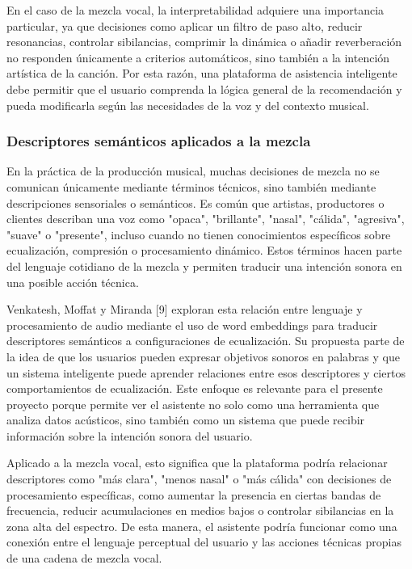 \documentclass[12pt]{article}
\begin{document}
En el caso de la mezcla vocal, la interpretabilidad adquiere una importancia particular, ya que decisiones como aplicar un filtro de paso alto, reducir resonancias, controlar sibilancias, comprimir la dinámica o añadir reverberación no responden únicamente a criterios automáticos, sino también a la intención artística de la canción. Por esta razón, una plataforma de asistencia inteligente debe permitir que el usuario comprenda la lógica general de la recomendación y pueda modificarla según las necesidades de la voz y del contexto musical.

\subsubsection*{Descriptores semánticos aplicados a la mezcla}

En la práctica de la producción musical, muchas decisiones de mezcla no se comunican únicamente mediante términos técnicos, sino también mediante descripciones sensoriales o semánticos. Es común que artistas, productores o clientes describan una voz como "opaca", "brillante", "nasal", "cálida", "agresiva", "suave" o "presente", incluso cuando no tienen conocimientos específicos sobre ecualización, compresión o procesamiento dinámico. Estos términos hacen parte del lenguaje cotidiano de la mezcla y permiten traducir una intención sonora en una posible acción técnica.

Venkatesh, Moffat y Miranda [9] exploran esta relación entre lenguaje y procesamiento de audio mediante el uso de word embeddings para traducir descriptores semánticos a configuraciones de ecualización. Su propuesta parte de la idea de que los usuarios pueden expresar objetivos sonoros en palabras y que un sistema inteligente puede aprender relaciones entre esos descriptores y ciertos comportamientos de ecualización. Este enfoque es relevante para el presente proyecto porque permite ver el asistente no solo como una herramienta que analiza datos acústicos, sino también como un sistema que puede recibir información sobre la intención sonora del usuario.

Aplicado a la mezcla vocal, esto significa que la plataforma podría relacionar descriptores como "más clara", "menos nasal" o "más cálida" con decisiones de procesamiento específicas, como aumentar la presencia en ciertas bandas de frecuencia, reducir acumulaciones en medios bajos o controlar sibilancias en la zona alta del espectro. De esta manera, el asistente podría funcionar como una conexión entre el lenguaje perceptual del usuario y las acciones técnicas propias de una cadena de mezcla vocal.
\end{document}
